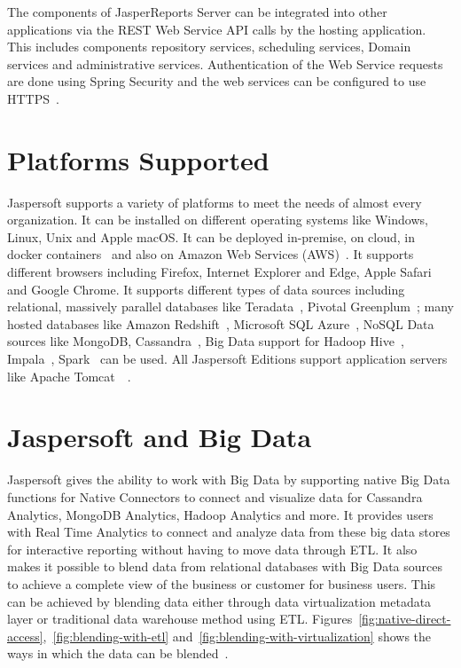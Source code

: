The components of JasperReports Server can be integrated into other applications
via the REST Web Service API calls by the hosting application. This includes
components repository services, scheduling services, Domain services and
administrative services. Authentication of the Web Service requests are done
using Spring Security and the web services can be configured to use
HTTPS~\cite{hid-sp18-516-www-jaspersoft-webservices}. 

\section{Platforms Supported}
Jaspersoft supports a variety of platforms to meet the needs of almost every
organization. It can be installed on different operating systems like Windows,
Linux, Unix and Apple macOS. It can be deployed in-premise, on cloud, in docker
containers~\cite{hid-sp18-516-www-docker} and also on Amazon Web Services 
(AWS)~\cite{hid-sp18-516-www-aws}. It supports different browsers including Firefox,
Internet Explorer and Edge, Apple Safari and Google Chrome. It supports different
types of data sources including relational, massively parallel databases like
Teradata~\cite{hid-sp18-516-www-techopedia-teradata}, Pivotal
Greenplum~\cite{hid-sp18-516-www-pivotal-greenplum}; many hosted databases like
Amazon Redshift~\cite{hid-sp18-516-www-aws-redshift}, Microsoft SQL
Azure~\cite{hid-sp18-516-www-microsoft-azure}, NoSQL Data sources like MongoDB,
Cassandra~\cite{hid-sp18-516-www-wiki-cassandra}, Big Data support for Hadoop
Hive~\cite{hid-sp18-516-www-wiki-hive},
Impala~\cite{hid-sp18-516-www-wiki-impala},
Spark~\cite{hid-sp18-516-www-wiki-spark} can be used. All Jaspersoft Editions
support application servers like Apache
Tomcat~\cite{hid-sp18-516-www-wiki-tomcat}~\cite{hid-sp18-516-www-jaspersoft-quick-start}.


\section{Jaspersoft and Big Data}
Jaspersoft gives the ability to work with Big Data by supporting native Big Data
functions for Native Connectors to connect and visualize data for Cassandra
Analytics, MongoDB Analytics, Hadoop Analytics and more. It provides users with
Real Time Analytics to connect and analyze data from these big data stores for
interactive reporting without having to move data through ETL. It also makes it
possible to blend data from relational databases with Big Data sources to
achieve a complete view of the business or customer for business users. This can
be achieved by blending data either through data virtualization metadata layer
or traditional data warehouse method using ETL.
Figures~\ref{fig:native-direct-access},~\ref{fig:blending-with-etl}
and~\ref{fig:blending-with-virtualization} shows the ways in which the data can
be blended~\cite{hid-sp18-516-www-jaspersoft-big-data}. 

